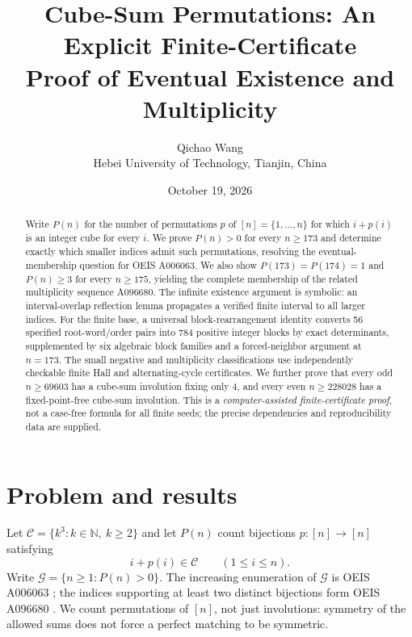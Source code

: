 \documentclass[9pt]{extarticle}
\title{Cube-Sum Permutations: An Explicit Finite-Certificate\\Proof of Eventual Existence and Multiplicity}
\author{Qichao Wang\\\small Hebei University of Technology, Tianjin, China}
\date{October 19, 2026}
\newcommand{\C}{\mathcal C}
\newcommand{\G}{\mathcal G}
\newcommand{\N}{\mathbb N}
\begin{document}
\maketitle
\begin{abstract}
Write $P(n)$ for the number of permutations $p$ of $[n]=\{1,\dots,n\}$ for which $i+p(i)$ is an integer cube for every $i$. We prove $P(n)>0$ for every $n\ge173$ and determine exactly which smaller indices admit such permutations, resolving the eventual-membership question for OEIS A006063. We also show $P(173)=P(174)=1$ and $P(n)\ge3$ for every $n\ge175$, yielding the complete membership of the related multiplicity sequence A096680. The infinite existence argument is symbolic: an interval-overlap reflection lemma propagates a verified finite interval to all larger indices. For the finite base, a universal block-rearrangement identity converts 56 specified root-word/order pairs into 784 positive integer blocks by exact determinants, supplemented by six algebraic block families and a forced-neighbor argument at $n=173$. The small negative and multiplicity classifications use independently checkable finite Hall and alternating-cycle certificates. We further prove that every odd $n\ge69603$ has a cube-sum involution fixing only $4$, and every even $n\ge228028$ has a fixed-point-free cube-sum involution. This is a \emph{computer-assisted finite-certificate proof}, not a case-free formula for all finite seeds; the precise dependencies and reproducibility data are supplied.
\end{abstract}

\section{Problem and results}\label{sec:intro}
Let $\C=\{k^3:k\in\N,\ k\ge2\}$ and let $P(n)$ count bijections $p:[n]\to[n]$ satisfying
\begin{equation}\label{eq:admissible} i+p(i)\in\C\qquad(1\le i\le n).\end{equation}
Write $\G=\{n\ge1:P(n)>0\}$. The increasing enumeration of $\G$ is OEIS A006063 \cite{oeis-a006063}; the indices supporting at least two distinct bijections form OEIS A096680 \cite{oeis-a096680}. We count permutations of $[n]$, not just involutions: symmetry of the allowed sums does not force a perfect matching to be symmetric.
\end{document}
